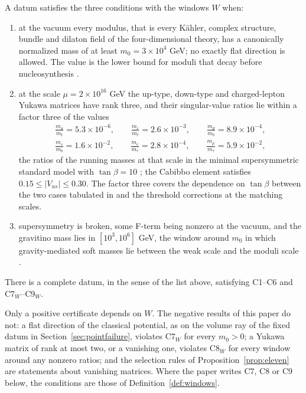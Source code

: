 \begin{definition}\label{def:windows}
A datum satisfies the three conditions with the windows $W$ when:
\begin{enumerate}[label=\textup{C\arabic*$_W$},start=7,leftmargin=*,itemsep=2pt]
\item at the vacuum every modulus, that is every K\"ahler, complex
structure, bundle and dilaton field of the four-dimensional theory, has a
canonically normalized mass of at least $m_0=3\times10^4$ GeV; no exactly
flat direction is allowed. The value is the lower bound for moduli that
decay before nucleosynthesis \cite{BKN94,AKK12}.
\item at the scale $\mu=2\times10^{16}$ GeV the up-type, down-type and
charged-lepton Yukawa matrices have rank three, and their singular-value
ratios lie within a factor three of the values
\begin{gather*}
 \frac{m_u}{m_t}=5.3\times10^{-6},\qquad \frac{m_c}{m_t}=2.6\times10^{-3},\qquad
 \frac{m_d}{m_b}=8.9\times10^{-4},\\
 \frac{m_s}{m_b}=1.6\times10^{-2},\qquad
 \frac{m_e}{m_\tau}=2.8\times10^{-4},\qquad \frac{m_\mu}{m_\tau}=5.9\times10^{-2},
\end{gather*}
the ratios of the running masses at that scale in the minimal
supersymmetric standard model with $\tan\beta=10$ \cite[Table~V]{XZZ08};
the Cabibbo element satisfies $0.15\le|V_{us}|\le0.30$. The factor three
covers the dependence on $\tan\beta$ between the two cases tabulated in
\cite{XZZ08} and the threshold corrections at the matching scales.
\item supersymmetry is broken, some F-term being nonzero at the vacuum,
and the gravitino mass lies in $[10^3,10^6]$ GeV, the window around $m_0$
in which gravity-mediated soft masses lie between the weak scale and the
moduli scale \cite{AKK12}.
\end{enumerate}
\end{definition}

\begin{conjecture}[GSC$(W)$]\label{conj:gscw}
There is a complete datum, in the sense of the list above, satisfying
C1--C6 and C7$_W$--C9$_W$.
\end{conjecture}

\begin{remark}\label{rem:windowsrobust}
Only a positive certificate depends on $W$. The negative results of this
paper do not: a flat direction of the classical potential, as on the
volume ray of the fixed datum in Section~\ref{sec:pointfailure}, violates
C7$_W$ for every $m_0>0$; a Yukawa matrix of rank at most two, or a
vanishing one, violates C8$_W$ for every window around any nonzero ratios;
and the selection rules of Proposition~\ref{prop:eleven} are statements
about vanishing matrices. Where the paper writes C7, C8 or C9 below, the
conditions are those of Definition~\ref{def:windows}.
\end{remark}

